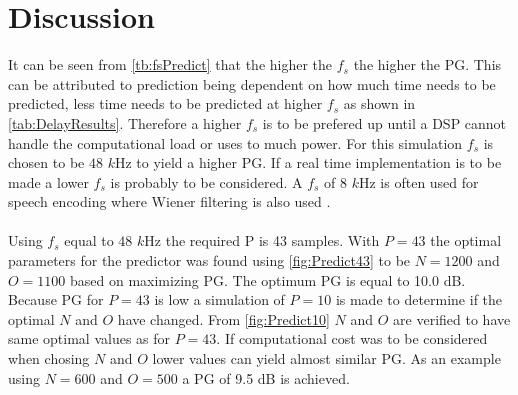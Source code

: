 \section{Discussion}
It can be seen from \autoref{tb:fsPredict} that the higher the $f_s$ the higher the PG. This can be attributed to prediction being dependent on how much time needs to be predicted, less time needs to be predicted at higher $f_s$ as shown in \autoref{tab:DelayResults}.  
Therefore a higher $f_s$ is to be prefered up until a DSP cannot handle the computational load or uses to much power. For this simulation $f_s$ is chosen to be $48$ $k$Hz to yield a higher PG. If a real time implementation is to be made a lower $f_s$ is probably to be considered. A $f_s$ of 8 $k$Hz is often used for speech encoding where Wiener filtering is also used \cite{Speech}.       
\\\\
Using $f_s$ equal to $48$ $k$Hz the required P is 43 samples. With $P=43$ the optimal parameters for the predictor was found using \autoref{fig:Predict43} to be $N=1200$ and $O=1100$ based on maximizing PG. The optimum PG is equal to 10.0 dB. Because PG for $P=43$ is low a simulation of $P=10$ is made to determine if the optimal $N$ and $O$ have changed. From \autoref{fig:Predict10} $N$ and $O$ are verified to have same optimal values as for $P=43$. If computational cost was to be considered when chosing $N$ and $O$ lower values can yield almost similar PG. As an example using $N=600$ and $O=500$ a PG of 9.5 dB is achieved.  








